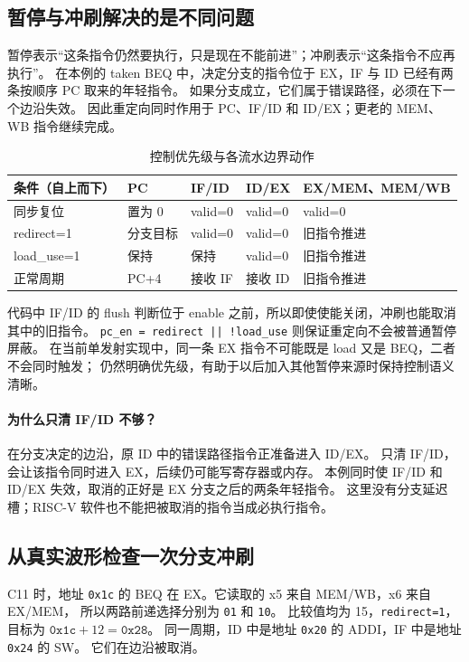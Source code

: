 \subsection{暂停与冲刷解决的是不同问题}

暂停表示“这条指令仍然要执行，只是现在不能前进”；冲刷表示“这条指令不应再执行”。
在本例的 taken BEQ 中，决定分支的指令位于 EX，IF 与 ID 已经有两条按顺序 PC 取来的年轻指令。
如果分支成立，它们属于错误路径，必须在下一个边沿失效。
因此重定向同时作用于 PC、IF/ID 和 ID/EX；更老的 MEM、WB 指令继续完成。

\begin{table}[htbp]
\centering\small
\caption{控制优先级与各流水边界动作}\label{tab:ch4-controls}
\begin{tabularx}{\linewidth}{p{.21\linewidth}p{.17\linewidth}p{.17\linewidth}p{.17\linewidth}Y}
\toprule
条件（自上而下） & PC & IF/ID & ID/EX & EX/MEM、MEM/WB \\\midrule
同步复位 & 置为 0 & valid=0 & valid=0 & valid=0\\
redirect=1 & 分支目标 & valid=0 & valid=0 & 旧指令推进\\
load\_use=1 & 保持 & 保持 & valid=0 & 旧指令推进\\
正常周期 & PC+4 & 接收 IF & 接收 ID & 旧指令推进\\
\bottomrule
\end{tabularx}
\end{table}

代码中 IF/ID 的 flush 判断位于 enable 之前，所以即使使能关闭，冲刷也能取消其中的旧指令。
\texttt{pc\_en = redirect || !load\_use} 则保证重定向不会被普通暂停屏蔽。
在当前单发射实现中，同一条 EX 指令不可能既是 load 又是 BEQ，二者不会同时触发；
仍然明确优先级，有助于以后加入其他暂停来源时保持控制语义清晰。

\paragraph{为什么只清 IF/ID 不够？}
在分支决定的边沿，原 ID 中的错误路径指令正准备进入 ID/EX。
只清 IF/ID，会让该指令同时进入 EX，后续仍可能写寄存器或内存。
本例同时使 IF/ID 和 ID/EX 失效，取消的正好是 EX 分支之后的两条年轻指令。
这里没有分支延迟槽；RISC-V 软件也不能把被取消的指令当成必执行指令。

\subsection{从真实波形检查一次分支冲刷}

C11 时，地址 \texttt{0x1c} 的 BEQ 在 EX。它读取的 x5 来自 MEM/WB，x6 来自 EX/MEM，
所以两路前递选择分别为 \texttt{01} 和 \texttt{10}。
比较值均为 15，\texttt{redirect=1}，目标为 \(\mathtt{0x1c}+12=\mathtt{0x28}\)。
同一周期，ID 中是地址 \texttt{0x20} 的 ADDI，IF 中是地址 \texttt{0x24} 的 SW。
它们在边沿被取消。

